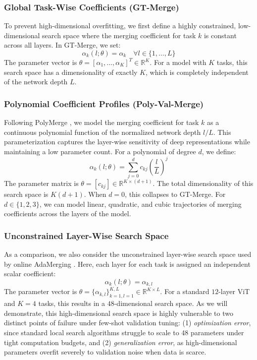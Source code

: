 \subsubsection{Global Task-Wise Coefficients (GT-Merge)}
To prevent high-dimensional overfitting, we first define a highly constrained, low-dimensional search space where the merging coefficient for task $k$ is constant across all layers. In GT-Merge, we set:
\begin{equation}
\alpha_k(l; \theta) = \alpha_k \quad \forall l \in \{1, \dots, L\}
\end{equation}
The parameter vector is $\theta = [\alpha_1, \dots, \alpha_K]^T \in \mathbb{R}^K$. For a model with $K$ tasks, this search space has a dimensionality of exactly $K$, which is completely independent of the network depth $L$.

\subsubsection{Polynomial Coefficient Profiles (Poly-Val-Merge)}
Following PolyMerge \cite{polymerge}, we model the merging coefficient for task $k$ as a continuous polynomial function of the normalized network depth $l/L$. This parameterization captures the layer-wise sensitivity of deep representations while maintaining a low parameter count. For a polynomial of degree $d$, we define:
\begin{equation}
\alpha_k(l; \theta) = \sum_{j=0}^d c_{kj} \left(\frac{l}{L}\right)^j
\end{equation}
The parameter matrix is $\theta = [c_{kj}] \in \mathbb{R}^{K \times (d+1)}$. The total dimensionality of this search space is $K(d+1)$. When $d=0$, this collapses to GT-Merge. For $d \in \{1, 2, 3\}$, we can model linear, quadratic, and cubic trajectories of merging coefficients across the layers of the model.

\subsubsection{Unconstrained Layer-Wise Search Space}
As a comparison, we also consider the unconstrained layer-wise search space used by online AdaMerging \cite{adamerging}. Here, each layer for each task is assigned an independent scalar coefficient:
\begin{equation}
\alpha_k(l; \theta) = \alpha_{k, l}
\end{equation}
The parameter vector is $\theta = \{\alpha_{k, l}\}_{k=1, l=1}^{K, L} \in \mathbb{R}^{K \times L}$. For a standard $12$-layer ViT and $K=4$ tasks, this results in a $48$-dimensional search space. As we will demonstrate, this high-dimensional search space is highly vulnerable to two distinct points of failure under few-shot validation tuning: (1) \emph{optimization error}, since standard local search algorithms struggle to scale to 48 parameters under tight computation budgets, and (2) \emph{generalization error}, as high-dimensional parameters overfit severely to validation noise when data is scarce.

